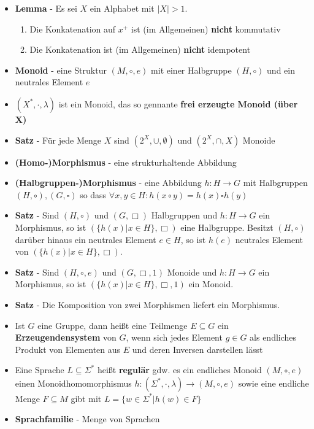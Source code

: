 \documentclass[12pt, a4paper]{article}
\begin{document}
\begin{itemize}
		\item \textbf{Lemma} - Es sei $X$ ein Alphabet mit $|X|>1$.
		\begin{enumerate}
			\item Die Konkatenation auf $x^{+}$ ist (im Allgemeinen) \textbf{nicht} kommutativ
			\item Die Konkatenation ist (im Allgemeinen) \textbf{nicht} idempotent
		\end{enumerate}
		
		\item \textbf{Monoid} - eine Struktur $(M,\circ,e)$ mit einer Halbgruppe $(H,\circ)$ und ein neutrales Element $e$
		
		\item $(X^{*}, \cdot, \lambda)$ ist ein Monoid, das so gennante \textbf{frei erzeugte Monoid (über X)}
		
		\item \textbf{Satz} - Für jede Menge $X$ sind $(2^{X},\cup,\emptyset)$ und $(2^{X},\cap,X)$ Monoide
		
		\item \textbf{(Homo-)Morphismus} - eine strukturhaltende Abbildung
		
		\item \textbf{(Halbgruppen-)Morphismus} - eine Abbildung $h:H\rightarrow G$ mit Halbgruppen $(H,\circ), (G,\square)$ so dass $\forall x,y\in H:h(x\circ y) = h(x)\square h(y)$
		
		\item \textbf{Satz} - Sind $(H,\circ)$ und $(G,\Box)$ Halbgruppen und $h:H\rightarrow G$ ein Morphismus, so ist $(\{h(x)|x\in H\},\Box)$ eine Halbgruppe. Besitzt $(H,\circ)$ darüber hinaus ein neutrales Element $e\in H$, so ist $h(e)$ neutrales Element von $(\{h(x)|x\in H\},\Box)$.
		
		\item \textbf{Satz} - Sind $(H,\circ,e)$ und $(G,\Box,1)$ Monoide und $h:H\rightarrow G$ ein Morphismus, so ist $(\{h(x)|x\in H\},\Box, 1)$ ein Monoid.
		
		\item \textbf{Satz} - Die Komposition von zwei Morphismen liefert ein Morphismus.
		
		\item Ist $G$ eine Gruppe, dann heißt eine Teilmenge $E\subseteq G$ ein \textbf{Erzeugendensystem} von $G$, wenn sich jedes Element $g\in G$ als endliches Produkt von Elementen aus $E$ und deren Inversen darstellen lässt
		
		\item Eine Sprache $L\subseteq\Sigma^{*}$ heißt \textbf{regulär} gdw. es ein endliches Monoid $(M,\circ,e)$ einen Monoidhomomorphismus $h:(\Sigma^{*},\cdot,\lambda)\rightarrow(M,\circ,e)$ sowie eine endliche Menge $F\subseteq M$ gibt mit $L=\{w\in\Sigma^{*}|h(w)\in F\}$
		
		\item \textbf{Sprachfamilie} - Menge von Sprachen
		
	\end{itemize}
	
\end{document}
